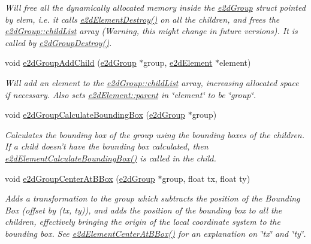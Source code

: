 \begin{DoxyCompactItemize}
\begin{DoxyCompactList}\small\item\em Will free all the dynamically allocated memory inside the \hyperlink{structe2dGroup}{e2d\-Group} struct pointed by elem, i.\-e. it calls \hyperlink{group__e2dElement_ga214c437a16fe6f3fc795539f851a2019}{e2d\-Element\-Destroy()} on all the children, and frees the \hyperlink{structe2dGroup_a55f6dde874716dc99dcd270fc0999a01}{e2d\-Group\-::child\-List} array (Warning, this might change in future versions). It is called by \hyperlink{group__e2dGroup_ga545626effa0f89b72f244e56aadb05bc}{e2d\-Group\-Destroy()}. \end{DoxyCompactList}\item 
void \hyperlink{group__e2dGroup_ga6ae76730f78ad731621e9286a3980b8a}{e2d\-Group\-Add\-Child} (\hyperlink{structe2dGroup}{e2d\-Group} $\ast$group, \hyperlink{structe2dElement}{e2d\-Element} $\ast$element)
\begin{DoxyCompactList}\small\item\em Will add an element to the \hyperlink{structe2dGroup_a55f6dde874716dc99dcd270fc0999a01}{e2d\-Group\-::child\-List} array, increasing allocated space if necessary. Also sets \hyperlink{structe2dElement_a3e62eb2fbf1d6bc6d6fe549096a6cee9}{e2d\-Element\-::parent} in \char`\"{}element\char`\"{} to be \char`\"{}group\char`\"{}. \end{DoxyCompactList}\item 
void \hyperlink{group__e2dGroup_ga7c5f43489bbd2d36a51414aee07abf5a}{e2d\-Group\-Calculate\-Bounding\-Box} (\hyperlink{structe2dGroup}{e2d\-Group} $\ast$group)
\begin{DoxyCompactList}\small\item\em Calculates the bounding box of the group using the bounding boxes of the children. If a child doesn't have the bounding box calculated, then \hyperlink{group__e2dElement_ga94aa710b2da71af2091fe4d5b87ce47e}{e2d\-Element\-Calculate\-Bounding\-Box()} is called in the child. \end{DoxyCompactList}\item 
void \hyperlink{group__e2dGroup_ga04bf94419865ca7f9d6daf30ce3fadf0}{e2d\-Group\-Center\-At\-B\-Box} (\hyperlink{structe2dGroup}{e2d\-Group} $\ast$group, float tx, float ty)
\begin{DoxyCompactList}\small\item\em Adds a transformation to the group which subtracts the position of the Bounding Box (offset by (tx, ty)), and adds the position of the bounding box to all the children, effectively bringing the origin of the local coordinate system to the bounding box. See \hyperlink{group__e2dElement_ga36b01a888c97163c990e16d348aff61c}{e2d\-Element\-Center\-At\-B\-Box()} for an explanation on \char`\"{}tx\char`\"{} and \char`\"{}ty\char`\"{}. \end{DoxyCompactList}\item 

\end{DoxyCompactItemize}
